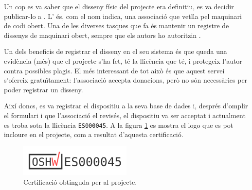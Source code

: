 Un cop es va saber que el disseny físic del projecte era definitiu, es va decidir
publicar-lo a . L' és, com el
nom indica, una associació que vetlla pel maquinari de codi obert. Una de les
diverses tasques que fa és mantenir un registre de dissenys de maquinari obert,
sempre que els autors ho autoritzin \cite{Oshwa}.

Un dels beneficis de registrar el disseny en el seu sistema és que queda una
evidència (més) que el projecte s'ha fet, té la llicència que té, i protegeix
l'autor contra possibles plagis. El més interessant de tot això és que aquest
servei s'ofereix gratuïtament: l'associació accepta donacions, però no són
necessàries per poder registrar un disseny.

Així doncs, es va registrar el dispositiu a la seva base de dades i, després
d'omplir el formulari i que l'associació el revisés, el dispositiu
va ser acceptat i actualment es troba sota la llicència \verb|ES000045|.
A la figura \ref{fig:oshwa} es mostra el logo que es pot incloure en el projecte,
com a resultat d'aquesta certificació.

\begin{figure}[ht]
    \centering
    \includegraphics[width=0.5\textwidth]{images/oshwa.png}
    \caption{Certificació  obtinguda per al projecte.}
    \label{fig:oshwa}
\end{figure}

